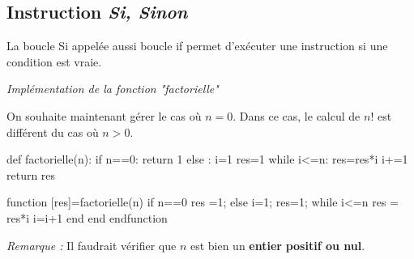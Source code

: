 \documentclass[10pt]{article}
\begin{document}
\subsection{Instruction \textsl{Si, Sinon}}

\begin{defi}
La boucle \textsf{Si} appelée aussi boucle \textsf{if} permet d'exécuter une instruction si une condition est vraie.
\end{defi}


\begin{exemple}
\textit{Implémentation de la fonction "factorielle"}

On souhaite maintenant gérer le cas où $n=0$. Dans ce cas, le calcul de $n!$ est différent du cas où $n>0$.

\begin{minipage}[c]{.35\linewidth}
\begin{pseudo}
\begin{algorithm}[H]
\end{algorithm}
\end{pseudo}
\end{minipage}\hfill
\begin{minipage}[c]{.3\linewidth}
\begin{py}
\begin{python}
def factorielle(n):
    if n==0:
        return 1
    else :
        i=1    
        res=1
        while i<=n:
            res=res*i
            i+=1
        return res
\end{python}
\end{py}
\end{minipage}\hfill
\begin{minipage}[c]{.3\linewidth}
\begin{sci}
\begin{scilab}
function [res]=factorielle(n)
  if n==0
    res =1;
  else
    i=1;
    res=1;
    while i<=n
      res = res*i
      i=i+1
    end
  end  
endfunction
\end{scilab}
\end{sci}
\end{minipage}

\textit{Remarque :} Il faudrait vérifier que $n$ est bien un \textbf{entier} \textbf{positif ou nul}.
\end{exemple}
\end{document}
